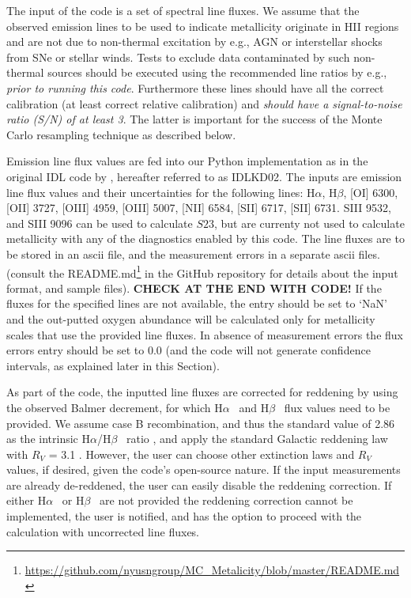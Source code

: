 \documentclass{emulateapj}
\newcommand{\ha}{H$\alpha$}
\newcommand{\hb}{H$\beta$}
\begin{document}
The input of the code is a set of spectral line fluxes. We assume that the observed emission lines to be used to indicate metallicity originate in HII regions and are not due to non-thermal excitation by e.g., AGN or interstellar shocks from SNe or stellar winds.  Tests to exclude data contaminated by such non-thermal sources should be executed using the recommended line ratios by e.g., \citealt{baldwin81,kauffmann03,kewley06_sdss} \emph{prior to running this code}. Furthermore these lines should have all the correct calibration (at least correct relative calibration) and \emph{should have a signal-to-noise ratio (S/N) of at least 3}. The latter is important for the success of the Monte Carlo resampling technique as described below.

Emission line flux values are fed into our Python implementation as in the original IDL code by \citet{kewley02}, hereafter referred to as IDLKD02. The inputs are emission line flux values and their uncertainties for the following lines: \ha, \hb, [OI] 6300, [OII] 3727, [OIII] 4959, [OIII] 5007, [NII] 6584, [SII] 6717, [SII] 6731.  SIII 9532, and SIII 9096 can be used to calculate $S23$, but are currenty not used to calculate metallicity with any of the diagnostics enabled by this code. The line fluxes are to be stored in an ascii file, and the measurement errors in a separate ascii files.
(consult the README.md\footnote{\url{https://github.com/nyusngroup/MC_Metalicity/blob/master/README.md}} in the GitHub repository for details about the input format, and sample files). \textbf{CHECK AT THE END WITH CODE!} 
 If the fluxes for the specified lines are not available, the entry should be set to `NaN' and the out-putted oxygen abundance will be calculated only for metallicity scales that use the provided line fluxes. In absence of measurement errors the flux errors entry should be set to 0.0 (and the code will not generate confidence intervals, as explained later in this Section).

As part of the code, the inputted line fluxes are corrected for reddening by using the observed Balmer decrement, for which \ha~ and  \hb~ flux values need to be provided. We assume case B recombination, and thus the standard value of 2.86 as the
intrinsic \ha/\hb~ ratio \citep{osterbrock89}, and apply the standard Galactic reddening law with $R_V$ = 3.1 \citep{cardelli89}. However, the user can choose other extinction laws and $R_V$ values, if desired, given the code's open-source nature. If the input measurements are already de-reddened, the user can easily disable the reddening correction. If either \ha~ or \hb~ are not provided the reddening correction cannot be implemented, the user is notified, and has the option to proceed with the calculation with uncorrected line fluxes.
\end{document}
